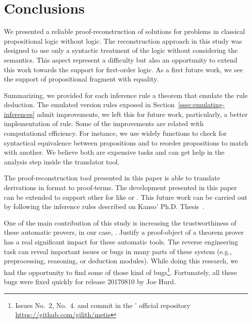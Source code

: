 \documentclass[../main.tex]{subfiles}
\begin{document}

\section{Conclusions}
\label{sec:conclusions}

We presented a reliable proof-reconstruction of \Metis solutions
for problems in classical propositional logic without logic.
The reconstruction approach in this study was designed to use
only a syntactic treatment of the logic without considering the
semantics. This aspect represent a difficulty but also an opportunity
to extend this work towards the support for first-order logic.
As a first future work, we see the support of \Metis propositional
fragment with equality.

Summarizing, we provided for each \Metis inference rule a theorem that
emulate the rule deduction. The emulated
version rules exposed in Section~\ref{ssec:emulating-inferences} admit
improvements, we left this for future work, particularly, a better
implementation of \simplify rule.
Some of the improvements are related with computational efficiency.
For instance, we use widely functions to check for syntactical equivalence
between propositions and to reorder propositions to match with another.
We believe both are expensive tasks and can get help in the analysis
step inside the translator tool.

The proof-reconstruction tool presented in this paper
is able to translate \Metis derivations in \TSTP format to \Agda proof-terms.
The development presented in this paper can be extended to support
other \ATPs for \CPL like  or .
This future work can be carried out by following the  inference
rules described on Kanso' Ph.D. Thesis~\cite{Kanso2012}.

One of the main contribution of this study is
increasing the trustworthiness of these automatic provers,
in our case, \Metis. Justify a proof-object of a theorem prover has a real
significant impact for these automatic tools.
The reverse engineering task can reveal important issues or bugs
in many parts of these system (e.g., preprocessing, reasoning, or
deduction modules). While doing this research, we had the opportunity
to find some of those kind of bugs\footnote{Issues No.~2, No.~4. and
commit  in the \Metis' official repository
\url{https://github.com/gilith/metis}}. Fortunately, all these bugs
were fixed quickly for release 20170810 by Joe Hurd.
\end{document}
